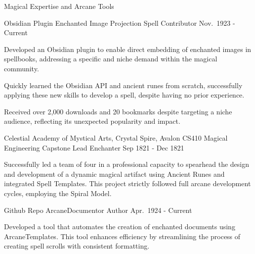 \documentclass[11pt, a4paper]{awesome-cv}
\begin{document}
\begin{cvsubsection}{Magical Expertise and Arcane Tools}
\begin{cventries}
\cventry
{Obsidian Plugin}
{Enchanted Image Projection}
{Spell Contributor}
{Nov.~1923 - Current}
{
\begin{cvitems}
    \item{\normalsize Developed an Obsidian plugin to enable direct
embedding of enchanted images in spellbooks, addressing a specific and
niche demand within the magical community.}
    \item{\normalsize Quickly learned the Obsidian API and ancient runes
from scratch, successfully applying these new skills to develop a spell,
despite having no prior experience.}
    \item{\normalsize Received over 2,000 downloads and 20 bookmarks
despite targeting a niche audience, reflecting its unexpected popularity
and impact.}
\end{cvitems}
}
\cventry
{Celestial Academy of Mystical Arts, Crystal Spire, Avalon}
{CS410 Magical Engineering Capstone}
{Lead Enchanter}
{Sep 1821 - Dec 1821}
{
\begin{cvitems}
    \item{\normalsize Successfully led a team of four in a professional
capacity to spearhead the design and development of a dynamic magical
artifact using Ancient Runes and integrated Spell Templates. This
project strictly followed full arcane development cycles, employing the
Spiral Model.}
\end{cvitems}
}
\cventry
{Github Repo}
{ArcaneDocumentor}
{Author}
{Apr.~1924 - Current}
{
\begin{cvitems}
    \item{\normalsize Developed a tool that automates the creation of
enchanted documents using ArcaneTemplates. This tool enhances efficiency
by streamlining the process of creating spell scrolls with consistent
formatting.}
\end{cvitems}
}
\end{cventries}


\vspace{4mm}
\begin{cventries}


\end{cventries}
\end{cvsubsection}
\end{document}
